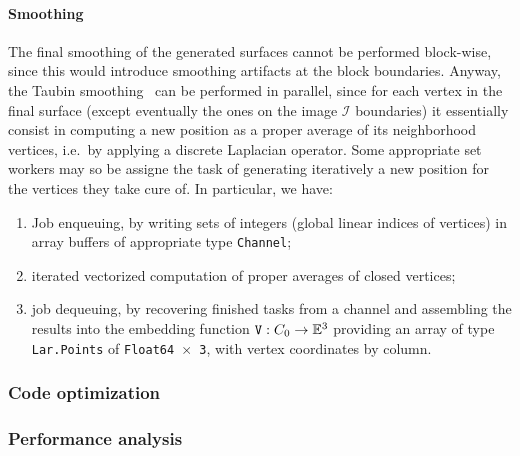 \paragraph{Smoothing} 
The final smoothing of the generated surfaces cannot be performed block-wise, since this would introduce smoothing artifacts at the block boundaries. Anyway, the Taubin smoothing~\cite{} can be performed in parallel, since for each vertex in the final surface (except eventually the ones on the image $\mathcal{I}$ boundaries) it essentially consist in computing a new position as a proper average of its neighborhood vertices, i.e.~by applying a discrete Laplacian operator.  Some appropriate set workers may so be assigne the task of generating iteratively a new position for the vertices they take cure of. In particular, we have:
\begin{enumerate}

\item Job enqueuing, by writing sets of integers (global linear indices of vertices) in array buffers of appropriate type \texttt{Channel};

\item iterated vectorized computation of proper averages of closed vertices;

\item job dequeuing, by recovering finished tasks from a channel and assembling the results into the embedding function $\mathtt{V}: C_0 \to \mathbb{E}^3$ providing an array of type \texttt{Lar.Points} of \texttt{Float64 $\times$ 3}, with vertex coordinates by column.
\end{enumerate}


\subsubsection{Code optimization}\label{sec:optimization}


\subsubsection{Performance analysis}\label{sec:analysis}


